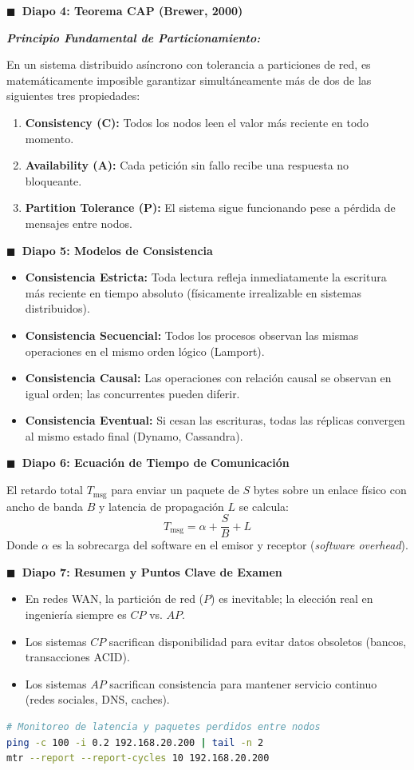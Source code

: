 \documentclass[9pt,a4paper,twocolumn]{extarticle}
\newcommand{\filmina}[2]{%
  \par\vspace{3.5pt}%
  \noindent\textbf{\sffamily\fontsize{8.5pt}{10.5pt}\selectfont $\blacksquare$\ Diapo #1: #2}%
  \par\vspace{1.5pt}%
}
\newcommand{\destacado}[1]{%
  \par\vspace{2.5pt}%
  \noindent\textit{\textbf{#1}}%
  \par\vspace{1pt}%
}
\begin{document}
\filmina{4}{Teorema CAP (Brewer, 2000)}
\destacado{Principio Fundamental de Particionamiento:}
En un sistema distribuido asíncrono con tolerancia a particiones de red, es matemáticamente imposible garantizar simultáneamente más de dos de las siguientes tres propiedades:
\begin{enumerate}
    \item \textbf{Consistency (C):} Todos los nodos leen el valor más reciente en todo momento.
    \item \textbf{Availability (A):} Cada petición sin fallo recibe una respuesta no bloqueante.
    \item \textbf{Partition Tolerance (P):} El sistema sigue funcionando pese a pérdida de mensajes entre nodos.
\end{enumerate}

\filmina{5}{Modelos de Consistencia}
\begin{itemize}
    \item \textbf{Consistencia Estricta:} Toda lectura refleja inmediatamente la escritura más reciente en tiempo absoluto (físicamente irrealizable en sistemas distribuidos).
    \item \textbf{Consistencia Secuencial:} Todos los procesos observan las mismas operaciones en el mismo orden lógico (Lamport).
    \item \textbf{Consistencia Causal:} Las operaciones con relación causal se observan en igual orden; las concurrentes pueden diferir.
    \item \textbf{Consistencia Eventual:} Si cesan las escrituras, todas las réplicas convergen al mismo estado final (Dynamo, Cassandra).
\end{itemize}

\filmina{6}{Ecuación de Tiempo de Comunicación}
El retardo total $T_{\text{msg}}$ para enviar un paquete de $S$ bytes sobre un enlace físico con ancho de banda $B$ y latencia de propagación $L$ se calcula:
$$T_{\text{msg}} = \alpha + \frac{S}{B} + L$$
Donde $\alpha$ es la sobrecarga del software en el emisor y receptor (\textit{software overhead}).

\filmina{7}{Resumen y Puntos Clave de Examen}
\begin{itemize}
    \item En redes WAN, la partición de red ($P$) es inevitable; la elección real en ingeniería siempre es $CP$ vs. $AP$.
    \item Los sistemas $CP$ sacrifican disponibilidad para evitar datos obsoletos (bancos, transacciones ACID).
    \item Los sistemas $AP$ sacrifican consistencia para mantener servicio continuo (redes sociales, DNS, caches).
\end{itemize}

\begin{lstlisting}[style=compactcode, language=bash]
# Monitoreo de latencia y paquetes perdidos entre nodos
ping -c 100 -i 0.2 192.168.20.200 | tail -n 2
mtr --report --report-cycles 10 192.168.20.200
\end{lstlisting}
\end{document}
